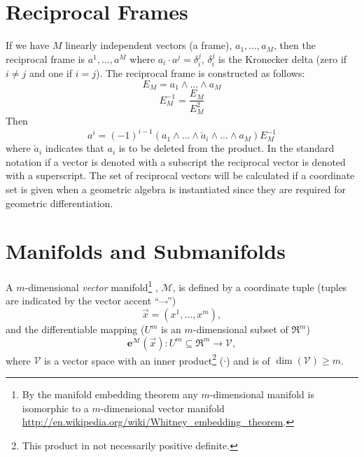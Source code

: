 \documentclass[12pt,twoside,openright]{memoir}
\newcommand{\bm}[1]{\boldsymbol{#1}}
\newcommand{\bfrac}[2]{\displaystyle\frac{#1}{#2}}
\newcommand{\lp}{\left (}
\newcommand{\rp}{\right )}
\newcommand{\W}{\wedge}
\newcommand{\f}[2]{{#1}\lp {#2} \rp}
\newcommand{\paren}[1]{\lp {#1} \rp}
\newcommand{\be}{\begin{equation}}
\newcommand{\ee}{\end{equation}}
\begin{document}
\section{Reciprocal Frames}

If we have $M$ linearly independent vectors (a frame),
$a_{1},\dots,a_{M}$, then the reciprocal frame is
$a^{1},\dots,a^{M}$ where $a_{i}\cdot a^{j} = \delta_{i}^{j}$,
$\delta_{i}^{j}$ is the Kronecker delta (zero if $i \ne j$ and one
if $i = j$). The reciprocal frame is constructed as follows:
  \begin{equation}
    E_{M} = a_{1}\W\dots\W a_{M}
  \end{equation}
  \begin{equation}
    E_{M}^{-1} = \bfrac{E_{M}}{E_{M}^{2}}
  \end{equation}
Then
  \begin{equation}
    a^{i} = \lp -1\rp^{i-1}\lp a_{1}\W\dots\W \breve{a}_{i} \W\dots\W a_{M}\rp E_{M}^{-1}
  \end{equation}
where $\breve{a}_{i}$ indicates that $a_{i}$ is to be deleted from
the product.  In the standard notation if a vector is denoted with a subscript
the reciprocal vector is denoted with a superscript. The set of reciprocal vectors
will be calculated if a coordinate set is given when a geometric algebra is instantiated since 
they are required for geometric differentiation.

\section{Manifolds and Submanifolds}\label{sect_manifold}

A $m$-dimensional \emph{vector} manifold\footnote{By the manifold embedding theorem any $m$-dimensional 
manifold is isomorphic to a $m$-dimensional vector manifold 
\url{http://en.wikipedia.org/wiki/Whitney_embedding_theorem}.}
, $\mathcal{M}$, is defined by a
coordinate tuple (tuples are indicated by the vector accent ``$\vec{\;\;\;}$'')
\be
	\vec{x} = \paren{x^{1},\dots,x^{m}},
\ee
and the differentiable mapping ($U^{m}$ is an $m$-dimensional subset of $\Re^{m}$)
\be
	\f{\bm{e}^{\mathcal{M}}}{\vec{x}}\colon U^{m}\subseteq\Re^{m}\rightarrow \mathcal{V},
\ee
where $\mathcal{V}$ is a vector space with an inner product\footnote{This product in not necessarily positive definite.} ($\cdot$) and is of $\f{\dim}{\mathcal{V}} \ge m$.
\end{document}
